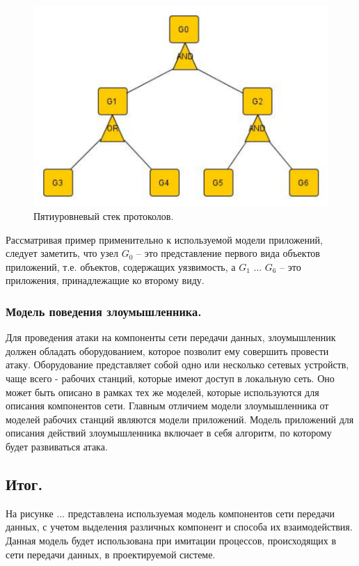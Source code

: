 \documentclass[12pt]{report}
\begin{document}
    \begin{figure}\center
        \includegraphics[width = 120mm]{Ch2Pic13}
        \caption{Пятиуровневый стек протоколов.} \label{Pic13}
    \end{figure}

    Рассматривая пример применительно к используемой модели приложений, следует заметить, что узел $G_{0}$ -- это представление первого вида объектов приложений, т.е. объектов, содержащих уязвимость, а $G_{1}$ ... $G_{6}$ -- это приложения, принадлежащие ко второму виду.

    \subsubsection{Модель поведения злоумышленника. }

    Для проведения атаки на компоненты сети передачи данных, злоумышленник должен обладать оборудованием, которое позволит ему совершить провести атаку. Оборудование представляет собой одно или несколько сетевых устройств, чаще всего - рабочих станций, которые имеют доступ в локальную сеть. Оно может быть описано в рамках тех же моделей, которые используются для описания компонентов сети. Главным отличием модели злоумышленника от моделей рабочих станций являются модели приложений. Модель приложений для описания действий злоумышленника включает в себя алгоритм, по которому будет развиваться атака.

    \subsection{Итог. }

    На рисунке ... представлена используемая модель компонентов сети передачи данных, с учетом выделения различных компонент и способа их взаимодействия. Данная модель будет использована при имитации процессов, происходящих в сети передачи данных, в проектируемой системе.
\end{document}

